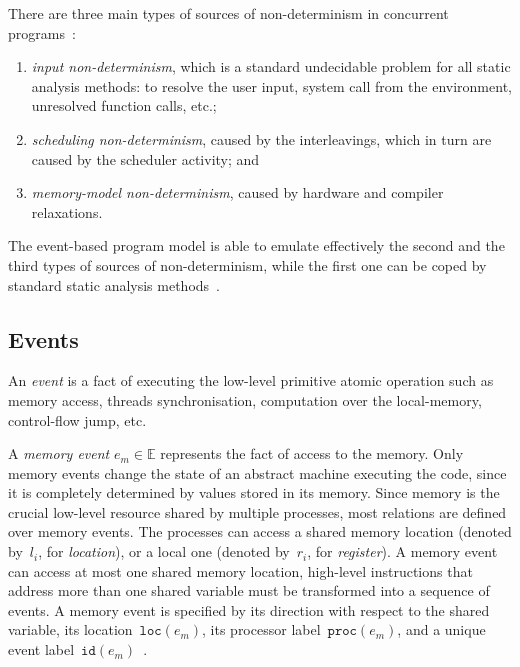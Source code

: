 There are three main types of sources of non-determinism in concurrent programs~\cite{musuvathi2008fair}:
\begin{enumerate}[noitemsep,topsep=0pt]
\item \textit{input non-determinism}, which is a standard undecidable problem for all static analysis methods: to resolve the user input, system call from the environment, unresolved function calls, etc.;
\item \textit{scheduling non-determinism}, caused by the interleavings, which in turn are caused by the scheduler activity; and
\item \textit{memory-model non-determinism}, caused by hardware and compiler relaxations.
\end{enumerate}

The event-based program model is able to emulate effectively the second and the third types of sources of non-determinism, while the first one can be coped by standard static analysis methods~\cite{landi1992undecidability,SurveySymExec-CSUR18}.


\subsection{Events}
\label{ch:wmm:model:events}

An \textit{event} is a fact of executing the low-level primitive atomic operation such as memory access, threads synchronisation, computation over the local-memory, control-flow jump, etc.

A \textit{memory event} $e_m \in \mathbb{E}$ represents the fact of access to the memory.
Only memory events change the state of an abstract machine executing the code, since it is completely determined by values stored in its memory.
Since memory is the crucial low-level resource shared by multiple processes, most relations are defined over memory events. 
The processes can access a shared memory location (denoted by~$l_i$, for \textit{location}), or a local one (denoted by~$r_i$, for \textit{register}).
A memory event can access at most one shared memory location, high-level instructions that address more than one shared variable must be transformed into a sequence of events.
A memory event is specified by its direction with respect to the shared variable, its location~$\texttt{loc}(e_m)$, its processor label~$\texttt{proc}(e_m)$, and a unique event label~$\texttt{id}(e_m)$~\cite{alglave2010shared}.

